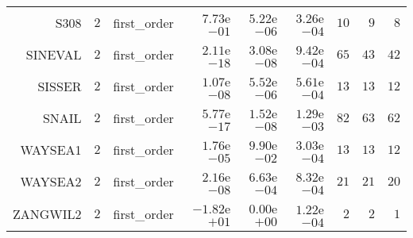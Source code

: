 \begin{longtable}{rrrrrrrrr}
S308 & \(     2\) & first\_order & \( 7.73\)e\(-01\) & \( 5.22\)e\(-06\) & \( 3.26\)e\(-04\) & \(    10\) & \(     9\) & \(     8\) \\
SINEVAL & \(     2\) & first\_order & \( 2.11\)e\(-18\) & \( 3.08\)e\(-08\) & \( 9.42\)e\(-04\) & \(    65\) & \(    43\) & \(    42\) \\
SISSER & \(     2\) & first\_order & \( 1.07\)e\(-08\) & \( 5.52\)e\(-06\) & \( 5.61\)e\(-04\) & \(    13\) & \(    13\) & \(    12\) \\
SNAIL & \(     2\) & first\_order & \( 5.77\)e\(-17\) & \( 1.52\)e\(-08\) & \( 1.29\)e\(-03\) & \(    82\) & \(    63\) & \(    62\) \\
WAYSEA1 & \(     2\) & first\_order & \( 1.76\)e\(-05\) & \( 9.90\)e\(-02\) & \( 3.03\)e\(-04\) & \(    13\) & \(    13\) & \(    12\) \\
WAYSEA2 & \(     2\) & first\_order & \( 2.16\)e\(-08\) & \( 6.63\)e\(-04\) & \( 8.32\)e\(-04\) & \(    21\) & \(    21\) & \(    20\) \\
ZANGWIL2 & \(     2\) & first\_order & \(-1.82\)e\(+01\) & \( 0.00\)e\(+00\) & \( 1.22\)e\(-04\) & \(     2\) & \(     2\) & \(     1\) \\\hline
\end{longtable}
